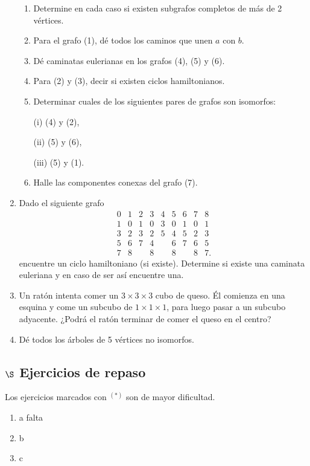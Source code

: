 \documentclass[a4paper,12pt,twoside,spanish,reqno]{amsbook}
\numberwithin{equation}{section}
\begin{document}
\begin{enumerate}
\begin{enumerate}
\item Determine en cada caso si existen subgrafos completos de más de 2 vértices.
\item Para el grafo (1), dé todos los caminos que unen $a$ con $b$.
\item Dé caminatas eulerianas en los grafos (4), (5) y (6).
\item Para (2) y (3), decir si existen ciclos hamiltonianos.
\item Determinar cuales de los siguientes pares de grafos son isomorfos:

 (i) (4) y (2),\quad

 (ii) (5) y (6), \quad

 (iii) (5) y (1).



\item Halle las componentes conexas del grafo (7).
\end{enumerate} 


\item Dado el siguiente grafo
$$
\begin{matrix}
0&1&2&3&4&5&6&7&8\\ \hline
1&0&1&0&3&0&1&0&1\\
3&2&3&2&5&4&5&2&3\\
5&6&7&4&&6&7&6&5\\
7&8&&8&&8&&8&7.
\end{matrix}
$$
encuentre un ciclo hamiltoniano (si existe). Determine si existe una caminata euleriana y en caso de ser así encuentre una. 


\item Un ratón intenta comer un $3\times 3\times 3$ cubo de queso. Él comienza en una esquina y come un subcubo de $1\times 1\times 1$, para luego pasar a un subcubo adyacente. ¿Podrá el ratón terminar de comer el queso en el centro?

\item Dé todos los árboles de 5 vértices no isomorfos.
\end{enumerate}

\subsection*{$\S$ Ejercicios de repaso} Los ejercicios marcados con ${}^{(*)}$ son de mayor dificultad.

\begin{enumerate}[resume]
    \item a falta
    \item b
    \item c
\end{enumerate}
\end{document}
